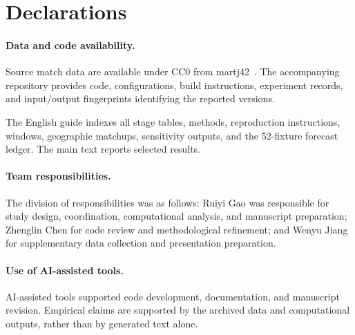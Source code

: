 \section*{Declarations}
\paragraph{Data and code availability.}
Source match data are available under CC0 from martj42~\citep{martj42_data}. The accompanying repository provides code, configurations, build instructions, experiment records, and input/output fingerprints identifying the reported versions.

The English guide  indexes all stage tables, methods, reproduction instructions, windows, geographic matchups, sensitivity outputs, and the 52-fixture forecast ledger. The main text reports selected results.

\paragraph{Team responsibilities.}
The division of responsibilities was as follows: Ruiyi Gao was responsible for study design, coordination, computational analysis, and manuscript preparation; Zhenglin Chen for code review and methodological refinement; and Wenyu Jiang for supplementary data collection and presentation preparation.

\paragraph{Use of AI-assisted tools.}
AI-assisted tools supported code development, documentation, and manuscript revision. Empirical claims are supported by the archived data and computational outputs, rather than by generated text alone.
